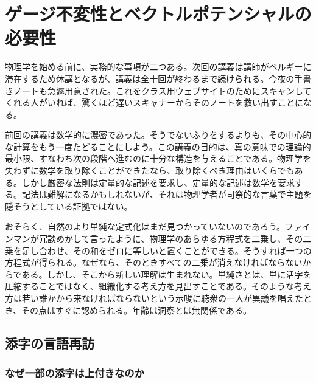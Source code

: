 \chapter{ゲージ不変性とベクトルポテンシャルの必要性}

物理学を始める前に、実務的な事項が二つある。次回の講義は講師がベルギーに滞在するため休講となるが、講義は全十回が終わるまで続けられる。今夜の手書きノートも急遽用意された。これをクラス用ウェブサイトのためにスキャンしてくれる人がいれば、驚くほど遅いスキャナーからそのノートを救い出すことになる。

前回の講義は数学的に濃密であった。そうでないふりをするよりも、その中心的な計算をもう一度たどることにしよう。この講義の目的は、真の意味での理論的最小限、すなわち次の段階へ進むのに十分な構造を与えることである。物理学を失わずに数学を取り除くことができたなら、取り除くべき理由はいくらでもある。しかし厳密な法則は定量的な記述を要求し、定量的な記述は数学を要求する。記法は難解になるかもしれないが、それは物理学者が司祭的な言葉で主題を隠そうとしている証拠ではない。

おそらく、自然のより単純な定式化はまだ見つかっていないのであろう。ファインマンが冗談めかして言ったように、物理学のあらゆる方程式を二乗し、その二乗を足し合わせ、その和をゼロに等しいと置くことができる。そうすれば一つの方程式が得られる。なぜなら、そのときすべての二乗が消えなければならないからである。しかし、そこから新しい理解は生まれない。単純さとは、単に活字を圧縮することではなく、組織化する考え方を見出すことである。そのような考え方は若い誰かから来なければならないという示唆に聴衆の一人が異議を唱えたとき、その点はすぐに認められる。年齢は洞察とは無関係である。


\section{添字の言語再訪}

\subsection{なぜ一部の添字は上付きなのか}

